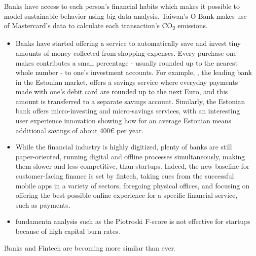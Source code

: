 \documentclass[
  letterpaper,
  DIV=11,
  numbers=noendperiod]{scrartcl}
\begin{document}
Banks have access to each person's financial habits which makes it
possible to model sustainable behavior using big data analysis. Taiwan's
O Bank makes use of Mastercard's data to calculate each transaction's
CO\textsubscript{2} emissions\citep{TaiwanOBankLaunches2022}.

\begin{itemize}
\item
  Banks have started offering a service to automatically save and invest
  tiny amounts of money collected from shopping expenses. Every purchase
  one makes contributes a small percentage - usually rounded up to the
  nearest whole number - to one's investment accounts. For example,
  \citet{swedbankEasySaver2022}, the leading bank in the Estonian
  market, offers a savings service where everyday payments made with
  one's debit card are rounded up to the next Euro, and this amount is
  transferred to a separate savings account. Similarly, the Estonian
  bank \citet{lhvMicroinvestmentGrowthAccount2020} offers
  micro-investing and micro-savings services, with an interesting user
  experience innovation showing how for an average Estonian means
  additional savings of about 400€ per year.
\item
  While the financial industry is highly digitized, plenty of banks are
  still paper-oriented, running digital and offline processes
  simultaneously, making them slower and less competitive, than
  startups. Indeed, the new baseline for customer-facing finance is set
  by fintech, taking cues from the successful mobile apps in a variety
  of sectors, foregoing physical offices, and focusing on offering the
  best possible online experience for a specific financial service, such
  as payments.
\item
  fundamenta analysis such as the Piotroski F-score is not effective for
  startups because of high capital burn rates.
\end{itemize}

Banks and Fintech are becoming more similar than ever.
\end{document}
